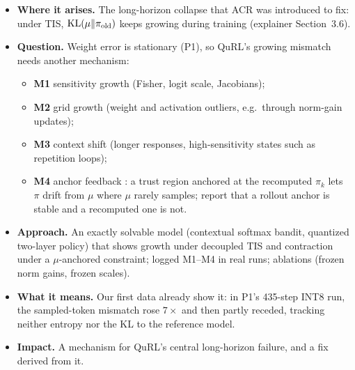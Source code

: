 \documentclass[11pt]{article}
\begin{document}
\begin{itemize}
\item \textbf{Where it arises.} The long-horizon collapse that ACR was introduced to fix: under TIS, $\mathrm{KL}(\mu\|\pi_{\mathrm{old}})$ keeps growing during training (explainer Section~3.6).
\item \textbf{Question.} Weight error is stationary (P1), so QuRL's growing mismatch needs another mechanism:
  \begin{itemize}
  \item \textbf{M1} sensitivity growth (Fisher, logit scale, Jacobians);
  \item \textbf{M2} grid growth (weight and activation outliers, e.g.\ through norm-gain updates);
  \item \textbf{M3} context shift (longer responses, high-sensitivity states such as repetition loops);
  \item \textbf{M4} anchor feedback \tagconj: a trust region anchored at the recomputed $\pi_k$ lets $\pi$ drift from $\mu$ where $\mu$ rarely samples; \citet{qi2026dppo} report that a rollout anchor is stable and a recomputed one is not.
  \end{itemize}
\item \textbf{Approach.} An exactly solvable model (contextual softmax bandit, quantized two-layer policy) that shows growth under decoupled TIS and contraction under a $\mu$-anchored constraint; logged M1--M4 in real runs; ablations (frozen norm gains, frozen scales).
\item \textbf{What it means.} Our first data already show it: in P1's 435-step INT8 run, the sampled-token mismatch rose $7\times$ and then partly receded, tracking neither entropy nor the KL to the reference model.
\item \textbf{Impact.} A mechanism for QuRL's central long-horizon failure, and a fix derived from it.
\end{itemize}
\end{document}
